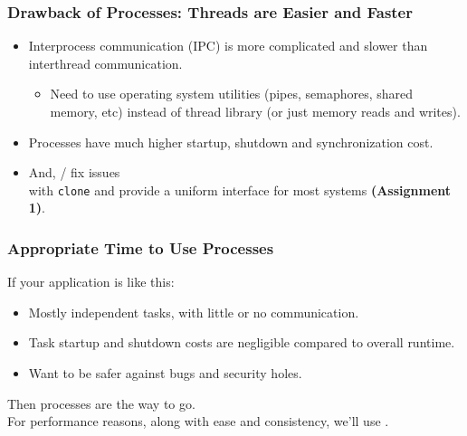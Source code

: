 \documentclass[aspectratio=43]{beamer}
\newenvironment{changemargin}[1]{%
  \begin{list}{}{%
    \setlength{\topsep}{0pt}%
    \setlength{\leftmargin}{#1}%
    \setlength{\rightmargin}{1em}
    \setlength{\listparindent}{\parindent}%
    \setlength{\itemindent}{\parindent}%
    \setlength{\parsep}{\parskip}%
  }%
  \item[]}{\end{list}}
\begin{document}
\begin{frame}[fragile]
  \frametitle{Drawback of Processes: Threads are Easier and Faster}

  \begin{changemargin}{1cm}
  \begin{itemize}
    \item Interprocess communication (IPC) is more complicated and slower than interthread
          communication.
      \begin{itemize}
        \item Need to use operating system utilities (pipes, semaphores, shared
              memory, etc) instead of thread library (or just memory reads and writes).
      \end{itemize}
    \item Processes have much higher startup, shutdown and synchronization cost.
    \item And, / fix issues\\ with {\tt clone} and provide a
          uniform interface for most systems {\bf (Assignment 1)}.
  \end{itemize}
  \end{changemargin}

\end{frame}

\begin{frame}[fragile]
  \frametitle{Appropriate Time to Use Processes}

  \begin{changemargin}{1cm}
  If your application is like this:
  \begin{itemize}
    \item Mostly independent tasks, with little or no communication.
    \item Task startup and shutdown costs are negligible compared to overall runtime.
    \item Want to be safer against bugs and security holes.
  \end{itemize}
  Then processes are the way to go. \\[1em]

  For performance reasons, along with ease and consistency, we'll use
  .
  \end{changemargin}

\end{frame}
\end{document}
